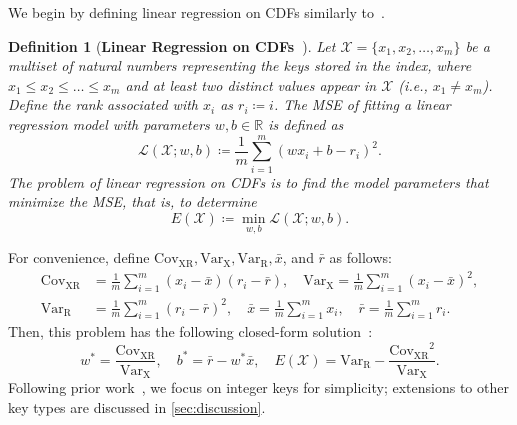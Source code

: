 \documentclass[acmsmall]{acmart}
\newtheorem{definition}{Definition}
\begin{document}
We begin by defining linear regression on CDFs similarly to~\cite{kornaropoulos2022price}.
\begin{definition_box}
\begin{definition}[\textbf{Linear Regression on CDFs~\cite[Def. 1]{kornaropoulos2022price}}]
\label{def:linear_regression_on_cdfs}
Let $\mathcal{X} = \{x_1, x_2, \dots, x_m\}$ be a multiset of natural numbers representing the keys stored in the index, where $x_1 \leq x_2 \leq \dots \leq x_m$ and at least two distinct values appear in $\mathcal{X}$ (i.e., $x_1 \neq x_m$).
Define the rank associated with $x_i$ as $r_i \coloneq i$.
The MSE of fitting a linear regression model with parameters $w, b \in \mathbb{R}$ is defined as
\begin{equation}
    \mathcal{L}(\mathcal{X};w,b) \coloneq \frac{1}{m} \sum_{i=1}^m \left(w x_i + b - r_i\right)^2.
\end{equation}
The problem of linear regression on CDFs is to find the model parameters that minimize the MSE, that is, to determine
\begin{equation}
    E(\mathcal{X}) \coloneq \min_{w,b} \mathcal{L}(\mathcal{X};w,b).
\end{equation}
\end{definition}
\end{definition_box}
For convenience, define $\mathrm{Cov}_\mathrm{XR}, \mathrm{Var}_\mathrm{X}, \mathrm{Var}_\mathrm{R}, \bar{x}$, and $\bar{r}$ as follows:
\begin{align}
\label{eq:cov_and_var_and_m}
    \mathrm{Cov}_\mathrm{XR} &= \frac{1}{m} \sum_{i=1}^m (x_i - \bar{x})(r_i - \bar{r}), \quad
    \mathrm{Var}_\mathrm{X} = \frac{1}{m} \sum_{i=1}^m (x_i - \bar{x})^2, \nonumber \\
    \mathrm{Var}_\mathrm{R} &= \frac{1}{m} \sum_{i=1}^m (r_i - \bar{r})^2, \quad
    \bar{x} = \frac{1}{m} \sum_{i=1}^m x_i, \quad
    \bar{r} = \frac{1}{m} \sum_{i=1}^m r_i.
\end{align}
Then, this problem has the following closed-form solution~\cite{kornaropoulos2022price}:
\begin{equation}
\label{eq:closed_form_solution}
    w^\ast = \frac{\mathrm{Cov}_\mathrm{XR}}{\mathrm{Var}_\mathrm{X}}, 
    \quad b^\ast = \bar{r} - w^\ast \bar{x}, 
    \quad E(\mathcal{X}) = \mathrm{Var}_\mathrm{R} - \frac{{\mathrm{Cov}_\mathrm{XR}}^2}{\mathrm{Var}_\mathrm{X}}.
\end{equation}
Following prior work~\cite{kornaropoulos2022price}, we focus on integer keys for simplicity; extensions to other key types are discussed in \cref{sec:discussion}.
\end{document}
